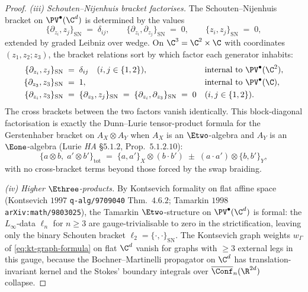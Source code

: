 \begin{proof}
\emph{(iii) Schouten--Nijenhuis bracket factorises.} The Schouten--Nijenhuis bracket on $\PV^\bullet(\C^d)$ is determined by the values
\begin{equation}
\label{eq:schouten-generators}
 \{\partial_{z_i}, z_j\}_{\mathrm{SN}} \;=\; \delta_{ij}, \qquad \{\partial_{z_i}, \partial_{z_j}\}_{\mathrm{SN}} \;=\; 0, \qquad \{z_i, z_j\}_{\mathrm{SN}} \;=\; 0,
\end{equation}
extended by graded Leibniz over wedge. On $\C^3 = \C^2 \times \C$ with coordinates $(z_1, z_2; z_3)$, the bracket relations sort by which factor each generator inhabits:
\begin{align}
 \{\partial_{z_i}, z_j\}_{\mathrm{SN}} &\;=\; \delta_{ij} \quad (i, j \in \{1, 2\}), &&\text{internal to } \PV^\bullet(\C^2), \notag \\
 \{\partial_{z_3}, z_3\}_{\mathrm{SN}} &\;=\; 1, &&\text{internal to } \PV^\bullet(\C), \notag \\
 \{\partial_{z_i}, z_3\}_{\mathrm{SN}} &\;=\; \{\partial_{z_3}, z_j\}_{\mathrm{SN}} \;=\; \{\partial_{z_i}, \partial_{z_3}\}_{\mathrm{SN}} \;=\; 0 &&(i, j \in \{1, 2\}). \notag
\end{align}
The cross brackets between the two factors vanish identically. This block-diagonal factorisation is exactly the Dunn--Lurie tensor-product formula for the Gerstenhaber bracket on $A_X \otimes A_Y$ when $A_X$ is an $\Etwo$-algebra and $A_Y$ is an $\Eone$-algebra (Lurie \emph{HA} \S$5.1.2$, Prop.~$5.1.2.10$):
\begin{equation}
\label{eq:lurie-tensor-bracket}
 \{a \otimes b,\; a' \otimes b'\}_{\mathrm{tot}} \;=\; \{a, a'\}_X \otimes (b \cdot b') \;\pm\; (a \cdot a') \otimes \{b, b'\}_Y,
\end{equation}
with no cross-bracket terms beyond those forced by the swap braiding.

\emph{(iv) Higher $\Ethree$-products.} By Kontsevich formality on flat affine space (Kontsevich $1997$ \texttt{q-alg/9709040} Thm.~$4.6.2$; Tamarkin $1998$ \texttt{arXiv:math/9803025}), the Tamarkin $\Etwo$-structure on $\PV^\bullet(\C^d)$ is formal: the $L_\infty$-data $\ell_n$ for $n \geq 3$ are gauge-trivialisable to zero in the strictification, leaving only the binary Schouten bracket $\ell_2 = \{\cdot, \cdot\}_{\mathrm{SN}}$. The Kontsevich graph weights $w_\Gamma$ of \eqref{eq:kt-graph-formula} on flat $\C^d$ vanish for graphs with $\geq 3$ external legs in this gauge, because the Bochner--Martinelli propagator on $\C^d$ has translation-invariant kernel and the Stokes' boundary integrals over $\overline{\Conf}_n(\R^{2d})$ collapse.


\end{proof}
